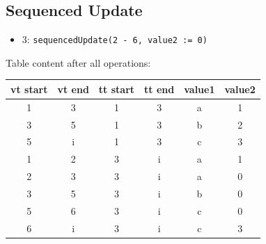 \documentclass{memoir}
\begin{document}
\subsection{Sequenced Update}

\begin{itemize}
	\item 3: \texttt{sequencedUpdate(2 - 6, value2 := 0)}
\end{itemize}


Table content after all operations:\\

\begin{tabular}{c  | c | c | c | c | c}
	vt start & vt end & tt start & tt end & value1 & value2\\\hline
	1 & 3 & 1 & 3 & a & 1 \\\hline
	3 & 5 & 1 & 3 & b & 2 \\\hline
	5 & i & 1 & 3 & c & 3 \\\hline
	1 & 2 & 3 & i & a & 1 \\\hline
	2 & 3 & 3 & i & a & 0 \\\hline
	3 & 5 & 3 & i & b & 0 \\\hline
	5 & 6 & 3 & i & c & 0 \\\hline
	6 & i & 3 & i & c & 3
\end{tabular}
\end{document}
